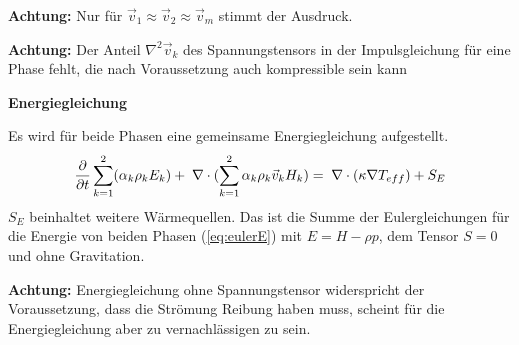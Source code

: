 {\bf Achtung:} Nur für $\vec{v}_1\approx\vec{v}_2\approx\vec{v}_m$
stimmt der Ausdruck.

{\bf Achtung:} Der Anteil $\nabla^2 \vec{v}_k$ des Spannungstensors in
der Impulsgleichung für eine Phase fehlt, die nach Voraussetzung auch
kompressible sein kann


{\bf Energiegleichung}

Es wird für beide Phasen eine gemeinsame Energiegleichung aufgestellt. 
\begin{equation}
\frac{\partial}{\partial t}\sum_{k=1}^2 (\alpha_k \rho_k E_k)
+ \;\nabla \cdot (\sum_{k=1}^2 \alpha_k \rho_k \vec{v}_k H_k) =
\;\nabla \cdot (\kappa \nabla T_{eff}) + S_E\label{eq:fluent-mixed-energie}
\end{equation}
$S_E$ beinhaltet weitere Wärmequellen.  Das ist die Summe der
Eulergleichungen für die Energie von beiden Phasen (\ref{eq:eulerE})
mit $E=H-\rho p$, dem Tensor $S=0$ und ohne Gravitation. 

{\bf Achtung:} Energiegleichung ohne Spannungstensor widerspricht der
Voraussetzung, dass die Strömung Reibung haben muss, scheint für die
Energiegleichung aber zu vernachlässigen zu sein.


